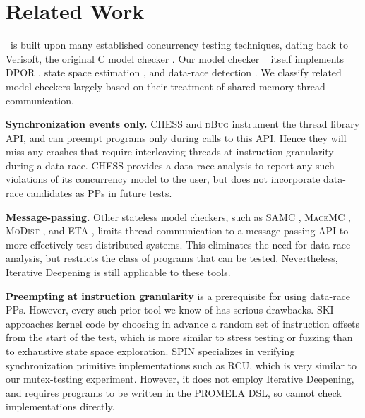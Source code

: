 \section{Related Work}


\quicksand~is built upon many established concurrency testing techniques, dating back
to Verisoft, the original C model checker \cite{verisoft}.
Our model checker \landslide~\cite{landslide}
itself implements DPOR \cite{dpor},
state space estimation \cite{estimation},
and data-race detection \cite{eraser}.
We classify related model checkers largely based on their treatment of shared-memory thread communication.

{\bf Synchronization events only.} CHESS \cite{chess} and \textsc{dBug} \cite{dbug-ssv} instrument the thread library API, and can preempt programs only during calls to this API.
Hence they will miss any crashes that require interleaving threads at instruction granularity during a data race. CHESS provides a data-race analysis to report any such violations of its concurrency model to the user, but does not incorporate data-race candidates as PPs in future tests.

{\bf Message-passing.} Other stateless model checkers, such as SAMC \cite{samc}, \textsc{MaceMC} \cite{macemc}, \textsc{MoDist} \cite{modist}, and ETA \cite{dbug-retreat}, limits thread communication to a message-passing API to more effectively test distributed systems.
This eliminates the need for data-race analysis, but restricts the class of programs that can be tested.
Nevertheless, Iterative Deepening is still applicable to these tools.

{\bf Preempting at instruction granularity} is a prerequisite for using data-race PPs. However, every such prior tool we know of has serious drawbacks.
{\textsc SKI} \cite{ski} approaches kernel code by choosing in advance a random set of instruction offsets from the start of the test,
which is more similar to stress testing or fuzzing than to exhaustive state space exploration.
SPIN \cite{spin} specializes in verifying synchronization primitive implementations such as RCU, which is very similar to our mutex-testing experiment.
However, it does not employ Iterative Deepening, and requires programs to be written in the PROMELA DSL, so cannot check implementations directly.

